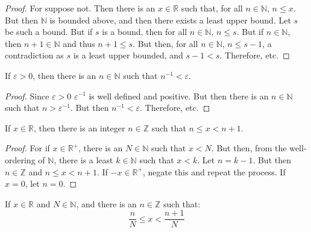 \documentclass[crop=false,class=book,oneside]{standalone}
\begin{document}
            \begin{proof}
                For suppose not. Then there is an $x\in\mathbb{R}$
                such that, for all $n\in\mathbb{N}$, $n\leq{x}$.
                But then $\mathbb{N}$ is bounded above, and then
                there exists a least upper bound. Let $s$ be such
                a bound. But if $s$ is a bound, then for all
                $n\in\mathbb{N}$, $n\leq{s}$. But if
                $n\in\mathbb{N}$, then $n+1\in\mathbb{N}$ and thus
                $n+1\leq{s}$. But then, for all $n\in\mathbb{N}$,
                $n\leq{s-1}$, a contradiction as $s$ is a least
                upper bounded, and $s-1<s$. Therefore, etc.
            \end{proof}
            \begin{theorem}
                If $\varepsilon>0$, then there is an
                $n\in\mathbb{N}$ such that
                $n^{\minus{1}}<\varepsilon$.
            \end{theorem}
            \begin{proof}
                Since $\varepsilon>0$ $\varepsilon^{\minus{1}}$ is
                well defined and positive. But then there is an
                $n\in\mathbb{N}$ such that
                $n>\varepsilon^{\minus{1}}$. But then
                $n^{\minus{1}}<\varepsilon$. Therefore, etc.
            \end{proof}
            \begin{theorem}
                If $x\in\mathbb{R}$, then there is an integer
                $n\in\mathbb{Z}$ such that
                $n\leq{x}<n+1$.
            \end{theorem}
            \begin{proof}
                For if $x\in\mathbb{R}^{+}$, there is an
                $N\in\mathbb{N}$ such that $x<N$. But then, from
                the well-ordering of $\mathbb{N}$, there is a
                least $k\in\mathbb{N}$ such that
                $x<k$. Let $n=k-1$. But then $n\in\mathbb{Z}$ and
                $n\leq{x}<n+1$. If $\minus{x}\in\mathbb{R}^{+}$,
                negate this and repeat the process. If $x=0$, let
                $n=0$.
            \end{proof}
            \begin{theorem}
                If $x\in\mathbb{R}$ and $N\in\mathbb{N}$, and there
                is an $n\in\mathbb{Z}$ such that:
                \begin{equation}
                    \frac{n}{N}\leq{x}<\frac{n+1}{N}
                \end{equation}
            \end{theorem}
\end{document}
